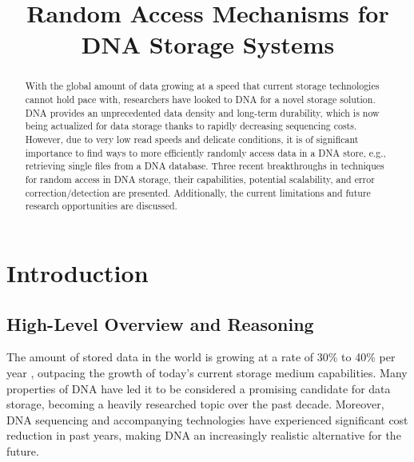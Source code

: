 \documentclass[a4paper,conference]{IEEEtran}
\begin{document}
%
\title{Random Access Mechanisms for \\ DNA Storage Systems}


\author{
}
\maketitle


\begin{abstract}
With the global amount of data growing at a speed that current storage technologies cannot hold pace with, researchers have looked to DNA for a novel storage solution. DNA provides an unprecedented data density and long-term durability, which is now being actualized for data storage thanks to rapidly decreasing sequencing costs. However, due to very low read speeds and delicate conditions, it is of significant importance to find ways to more efficiently randomly access data in a DNA store, e.g., retrieving single files from a DNA database. Three recent breakthroughs in techniques for random access in DNA storage, their capabilities, potential scalability, and error correction/detection are presented. Additionally, the current limitations and future research opportunities are discussed.
\end{abstract}
\IEEEpeerreviewmaketitle


\section{Introduction}

\subsection{High-Level Overview and Reasoning}

The amount of stored data in the world is growing at a rate of 30\% to 40\% per year \cite{rydning_digitization_2018}, outpacing the growth of today's current storage medium capabilities. Many properties of DNA have led it to be considered a promising candidate for data storage, becoming a heavily researched topic over the past decade.  Moreover, DNA sequencing and accompanying technologies have experienced significant cost reduction \cite{bornholt_dna-based_2016} in past years, making DNA an increasingly realistic alternative for the future. 
\end{document}
